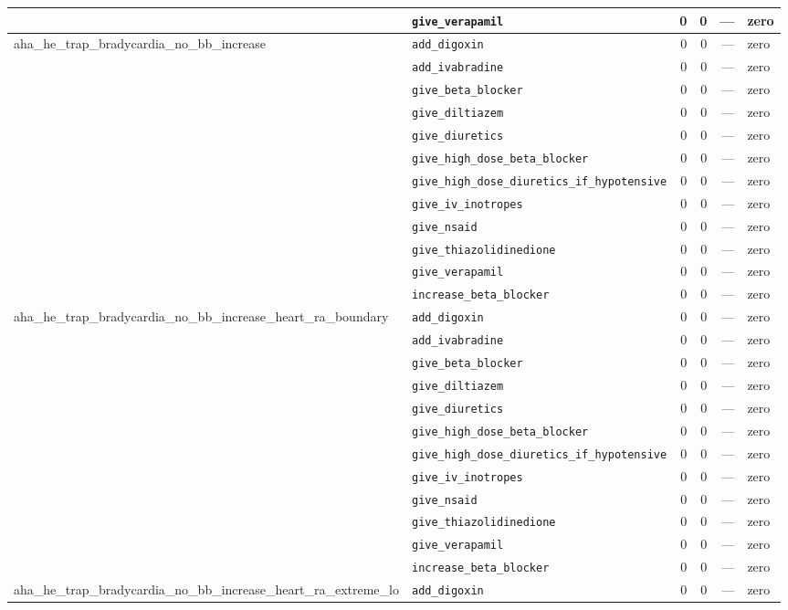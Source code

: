 \begin{table}[ht]
\begin{tabular}{llrrrl}
 & \texttt{give\_verapamil} & 0 & 0 & — & zero \\
\midrule
aha\_he\_trap\_bradycardia\_no\_bb\_increase & \texttt{add\_digoxin} & 0 & 0 & — & zero \\
 & \texttt{add\_ivabradine} & 0 & 0 & — & zero \\
 & \texttt{give\_beta\_blocker} & 0 & 0 & — & zero \\
 & \texttt{give\_diltiazem} & 0 & 0 & — & zero \\
 & \texttt{give\_diuretics} & 0 & 0 & — & zero \\
 & \texttt{give\_high\_dose\_beta\_blocker} & 0 & 0 & — & zero \\
 & \texttt{give\_high\_dose\_diuretics\_if\_hypotensive} & 0 & 0 & — & zero \\
 & \texttt{give\_iv\_inotropes} & 0 & 0 & — & zero \\
 & \texttt{give\_nsaid} & 0 & 0 & — & zero \\
 & \texttt{give\_thiazolidinedione} & 0 & 0 & — & zero \\
 & \texttt{give\_verapamil} & 0 & 0 & — & zero \\
 & \texttt{increase\_beta\_blocker} & 0 & 0 & — & zero \\
\midrule
aha\_he\_trap\_bradycardia\_no\_bb\_increase\_heart\_ra\_boundary & \texttt{add\_digoxin} & 0 & 0 & — & zero \\
 & \texttt{add\_ivabradine} & 0 & 0 & — & zero \\
 & \texttt{give\_beta\_blocker} & 0 & 0 & — & zero \\
 & \texttt{give\_diltiazem} & 0 & 0 & — & zero \\
 & \texttt{give\_diuretics} & 0 & 0 & — & zero \\
 & \texttt{give\_high\_dose\_beta\_blocker} & 0 & 0 & — & zero \\
 & \texttt{give\_high\_dose\_diuretics\_if\_hypotensive} & 0 & 0 & — & zero \\
 & \texttt{give\_iv\_inotropes} & 0 & 0 & — & zero \\
 & \texttt{give\_nsaid} & 0 & 0 & — & zero \\
 & \texttt{give\_thiazolidinedione} & 0 & 0 & — & zero \\
 & \texttt{give\_verapamil} & 0 & 0 & — & zero \\
 & \texttt{increase\_beta\_blocker} & 0 & 0 & — & zero \\
\midrule
aha\_he\_trap\_bradycardia\_no\_bb\_increase\_heart\_ra\_extreme\_lo & \texttt{add\_digoxin} & 0 & 0 & — & zero \\

\end{tabular}
\end{table}
